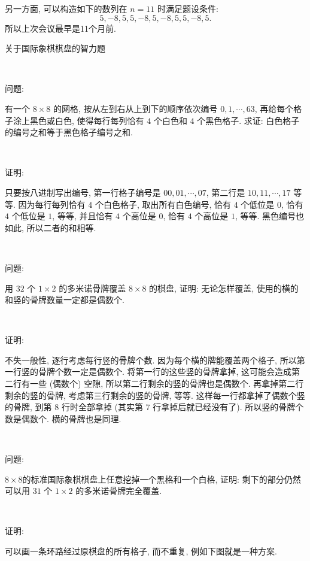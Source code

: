 另一方面, 可以构造如下的数列在 $n = 11$ 时满足题设条件: 
\[ 5, -8, 5, 5, -8, 5, -8, 5, 5, -8, 5 .\]
所以上次会议最早是11个月前.

\newpage
\noindent 关于国际象棋棋盘的智力题

~

\noindent 问题:

有一个 $ 8\times 8$ 的网格, 按从左到右从上到下的顺序依次编号 $0, 1, \cdots, 63 $, 再给每个格子涂上黑色或白色, 使得每行每列恰有 $ 4 $ 个白色和 $ 4 $ 个黑色格子. 求证: 白色格子的编号之和等于黑色格子编号之和.

~

\noindent 证明:

只要按八进制写出编号, 第一行格子编号是 $00, 01, \cdots, 07 $, 第二行是 $ 10, 11, \cdots, 17 $ 等等.
因为每行每列恰有 $ 4 $ 个白色格子, 取出所有白色编号, 恰有 $ 4 $ 个低位是 $ 0 $, 恰有 $ 4 $ 个低位是 $ 1 $, 等等, 并且恰有 $ 4 $ 个高位是 $ 0 $, 恰有 $ 4 $ 个高位是 $ 1 $, 等等. 黑色编号也如此, 所以二者的和相等. 

~

\noindent 问题: 

用 $ 32 $ 个 $ 1\times 2 $ 的多米诺骨牌覆盖 $ 8 \times 8 $ 的棋盘, 证明: 无论怎样覆盖, 使用的横的和竖的骨牌数量一定都是偶数个.

~

\noindent 证明:

不失一般性, 逐行考虑每行竖的骨牌个数. 因为每个横的牌能覆盖两个格子, 所以第一行竖的骨牌个数一定是偶数个. 将第一行的这些竖的骨牌拿掉, 这可能会造成第二行有一些 (偶数个) 空隙, 所以第二行剩余的竖的骨牌也是偶数个. 再拿掉第二行剩余的竖的骨牌, 考虑第三行剩余的竖的骨牌, 等等. 这样每一行都拿掉了偶数个竖的骨牌, 到第 $ 8 $ 行时全部拿掉 (其实第 $ 7 $ 行拿掉后就已经没有了). 所以竖的骨牌个数是偶数个. 横的骨牌也是同理.

~

\noindent 问题:

$8\times 8$的标准国际象棋棋盘上任意挖掉一个黑格和一个白格, 证明: 剩下的部分仍然可以用 $ 31 $ 个 $ 1\times 2 $ 的多米诺骨牌完全覆盖.

~

\noindent 证明: 

可以画一条环路经过原棋盘的所有格子, 而不重复, 例如下图就是一种方案.
\begin{figure*}[htbp]
\centering
{}
\end{figure*}

